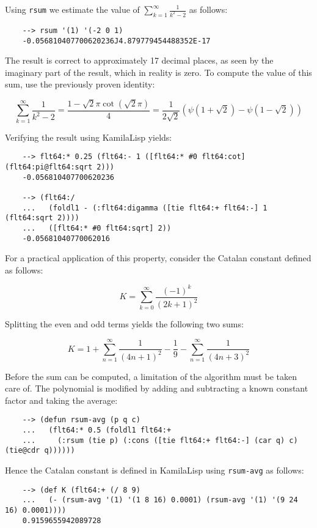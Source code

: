 Using \verb|rsum| we estimate the value of $\displaystyle \sum_{k=1}^{\infty} \frac{1}{k^2-2}$ as follows:

\begin{Verbatim}
    --> rsum '(1) '(-2 0 1)
    -0.056810407700620236J4.879779454488352E-17
\end{Verbatim}

The result is correct to approximately 17 decimal places, as seen by the imaginary part of the result, which in reality is zero. To compute the value of this sum, use the previously proven identity:

$$\sum_{k=1}^\infty \frac{1}{k^2 - 2} = \frac{1-\sqrt{2}\pi\cot(\sqrt{2}\pi)}{4} = \frac{1}{2\sqrt{2}}\left(\psi\left(1+\sqrt{2}\right)-\psi\left(1-\sqrt{2}\right)\right)$$

Verifying the result using KamilaLisp yields:

\begin{Verbatim}
    --> flt64:* 0.25 (flt64:- 1 ([flt64:* #0 flt64:cot] (flt64:pi@flt64:sqrt 2)))
    -0.056810407700620236

    --> (flt64:/
    ...   (foldl1 - (:flt64:digamma ([tie flt64:+ flt64:-] 1 (flt64:sqrt 2))))
    ...   ([flt64:* #0 flt64:sqrt] 2))
    -0.05681040770062016
\end{Verbatim}

For a practical application of this property, consider the Catalan constant defined as follows:

$$
K = \sum_{k=0}^\infty \frac{(-1)^k}{(2k+1)^2}
$$

Splitting the even and odd terms yields the following two sums:

$$
K = 1 + \sum_{n=1}^\infty \frac{1}{(4n+1)^2} - \frac{1}{9} - \sum_{n=1}^\infty \frac{1}{(4n+3)^2}
$$

Before the sum can be computed, a limitation of the algorithm must be taken care of. The polynomial is modified by adding and subtracting a known constant factor and taking the average:

\begin{Verbatim}
    --> (defun rsum-avg (p q c)
    ...   (flt64:* 0.5 (foldl1 flt64:+
    ...     (:rsum (tie p) (:cons ([tie flt64:+ flt64:-] (car q) c) (tie@cdr q))))))
\end{Verbatim}

Hence the Catalan constant is defined in KamilaLisp using \verb|rsum-avg| as follows:

\begin{Verbatim}
    --> (def K (flt64:+ (/ 8 9)
    ...   (- (rsum-avg '(1) '(1 8 16) 0.0001) (rsum-avg '(1) '(9 24 16) 0.0001))))
    0.9159655942089728
\end{Verbatim}

